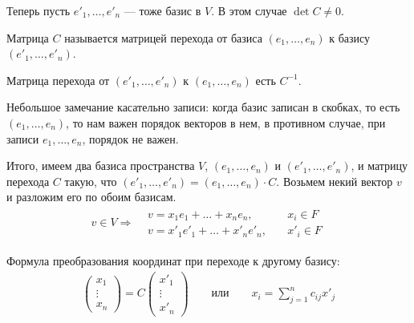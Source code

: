Теперь пусть $e'_1, \ldots, e'_n$ --- тоже базис в $V$. В этом случае $\det C \neq 0$.

\begin{Def}
Матрица $C$ называется матрицей перехода от базиса $(e_1, \ldots, e_n)$ к базису $(e'_1, \ldots, e'_n)$.
\end{Def}

\begin{Comment}
Матрица перехода от $(e'_1, \ldots, e'_n)$ к $(e_1, \ldots, e_n)$ есть $C^{-1}$.
\end{Comment}

Небольшое замечание касательно записи: когда базис записан в скобках, то есть $(e_1, \ldots, e_n)$, то нам важен порядок векторов в нем, в противном случае, при записи $e_1, \ldots, e_n$, порядок не важен.

Итого, имеем два базиса пространства $V$, $(e_1, \ldots, e_n)$ и $(e'_1, \ldots, e'_n)$, и матрицу перехода $C$ такую, что $(e'_1, \ldots, e'_n) = (e_1, \ldots, e_n) \cdot C$. Возьмем некий вектор $v$ и разложим его по обоим базисам.
\begin{gather*}
v \in V \Rightarrow 
\begin{aligned}
& v = x_1e_1 + \ldots + x_ne_n, \quad & x_i \in F \\
& v = x'_1e'_1 + \ldots + x'_ne'_n, \quad & x'_i \in F
\end{aligned}
\end{gather*}

\begin{Suggestion}
Формула преобразования координат при переходе к другому базису:
\begin{gather*}
\begin{pmatrix*}
x_1 \\
\vdots \\
x_n
\end{pmatrix*}
= C 
\begin{pmatrix*}
x'_1 \\
\vdots \\
x'_n
\end{pmatrix*}
\qquad \text{или} \qquad
x_i = \sum_{j = 1}^{n}c_{ij}x'_j
\end{gather*}
\end{Suggestion}


